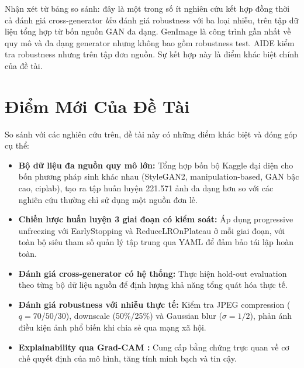 Nhận xét từ bảng so sánh: đây là một trong số ít nghiên cứu kết hợp đồng thời cả đánh giá cross-generator \textit{lẫn} đánh giá robustness với ba loại nhiễu, trên tập dữ liệu tổng hợp từ bốn nguồn GAN đa dạng. GenImage là công trình gần nhất về quy mô và đa dạng generator nhưng không bao gồm robustness test. AIDE kiểm tra robustness nhưng trên tập đơn nguồn. Sự kết hợp này là điểm khác biệt chính của đề tài.

\section{Điểm Mới Của Đề Tài}

So sánh với các nghiên cứu trên, đề tài này có những điểm khác biệt và đóng góp cụ thể:

\begin{itemize}
  \item \textbf{Bộ dữ liệu đa nguồn quy mô lớn:} Tổng hợp bốn bộ Kaggle đại diện cho bốn phương pháp sinh khác nhau (StyleGAN2, manipulation-based, GAN bậc cao, ciplab), tạo ra tập huấn luyện 221.571 ảnh đa dạng hơn so với các nghiên cứu thường chỉ sử dụng một nguồn đơn lẻ.

  \item \textbf{Chiến lược huấn luyện 3 giai đoạn có kiểm soát:} Áp dụng progressive unfreezing với EarlyStopping và ReduceLROnPlateau ở mỗi giai đoạn, với toàn bộ siêu tham số quản lý tập trung qua YAML để đảm bảo tái lập hoàn toàn.

  \item \textbf{Đánh giá cross-generator có hệ thống:} Thực hiện hold-out evaluation theo từng bộ dữ liệu nguồn để định lượng khả năng tổng quát hóa thực tế.

  \item \textbf{Đánh giá robustness với nhiễu thực tế:} Kiểm tra JPEG compression ($q = 70/50/30$), downscale (50\%/25\%) và Gaussian blur ($\sigma = 1/2$), phản ánh điều kiện ảnh phổ biến khi chia sẻ qua mạng xã hội.

  \item \textbf{Explainability qua Grad-CAM \cite{selvaraju2017gradcam}:} Cung cấp bằng chứng trực quan về cơ chế quyết định của mô hình, tăng tính minh bạch và tin cậy.
\end{itemize}
